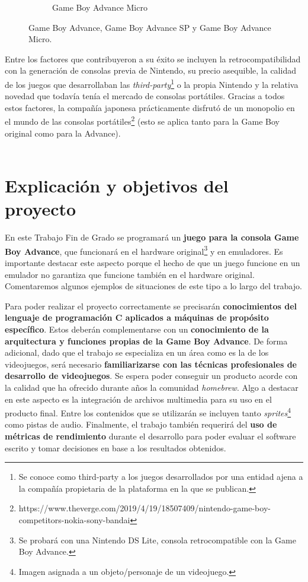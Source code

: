 \begin{figure}[b]
\begin{subfigure}[h]{0.3\textwidth}
		\label{fig:modelo_c}
		\caption{Game Boy Advance Micro}
	\end{subfigure}
	\caption{Game Boy Advance, Game Boy Advance SP y Game Boy Advance Micro.}
	\label{fig:modelos}
\end{figure}


Entre los factores que contribuyeron a su éxito se incluyen la retrocompatibilidad con la generación de consolas previa de Nintendo, su precio asequible, la calidad de los juegos que desarrollaban las {\it third-party}\footnote{Se conoce como third-party a los juegos desarrollados por una entidad ajena a la compañía propietaria de la plataforma en la que se publican.} o la propia Nintendo y la relativa novedad que todavía tenía el mercado de consolas portátiles. Gracias a todos estos factores, la compañía japonesa prácticamente disfrutó de un monopolio en el mundo de las consolas portátiles\footnote{https://www.theverge.com/2019/4/19/18507409/nintendo-game-boy-competitors-nokia-sony-bandai} (esto se aplica tanto para la Game Boy original como para la Advance). \\ \\

\section{Explicación y objetivos del proyecto}\label{sec:objs}

En este Trabajo Fin de Grado se programará un {\bf juego para la consola Game Boy Advance}, que funcionará en el hardware original\footnote{Se probará con una Nintendo DS Lite, consola retrocompatible con la Game Boy Advance.} y en emuladores. Es importante destacar este aspecto porque el hecho de que un juego funcione en un emulador no garantiza que funcione también en el hardware original. Comentaremos algunos ejemplos de situaciones de este tipo a lo largo del trabajo.

Para poder realizar el proyecto correctamente se precisarán {\bf conocimientos del lenguaje de programación C aplicados a máquinas de propósito específico}. Estos deberán complementarse con un {\bf conocimiento de la arquitectura y funciones propias de la Game Boy Advance}. De forma adicional, dado que el trabajo se especializa en un área como es la de los videojuegos, será necesario {\bf familiarizarse con las técnicas profesionales de desarrollo de videojuegos}. Se espera poder conseguir un producto acorde con la calidad que ha ofrecido durante años la comunidad {\it homebrew}. Algo a destacar en este aspecto es la integración de archivos multimedia para su uso en el producto final. Entre los contenidos que se utilizarán se incluyen tanto {\it sprites}\footnote{Imagen asignada a un objeto/personaje de un videojuego.} como pistas de audio. Finalmente, el trabajo también requerirá del {\bf uso de métricas de rendimiento} durante el desarrollo para poder evaluar el software escrito y tomar decisiones en base a los resultados obtenidos.

